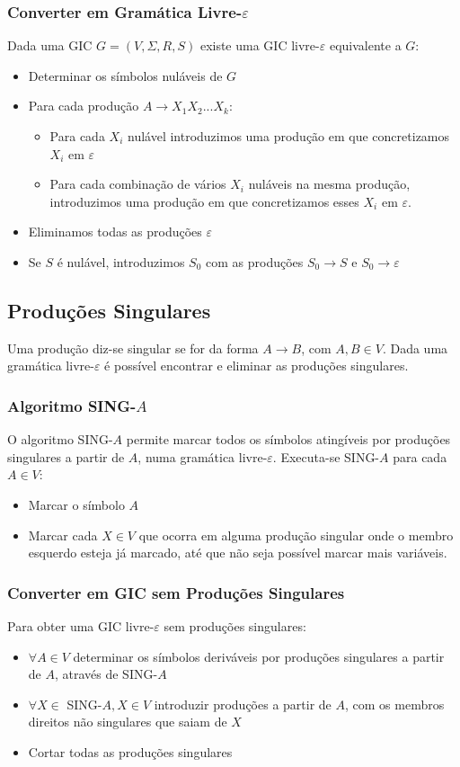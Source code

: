 \documentclass[10pt,a4paper]{report}
\begin{document}
\subsubsection{Converter em Gramática Livre-$\varepsilon$}
Dada uma GIC $G = (V, \Sigma, R, S)$ existe uma GIC livre-$\varepsilon$ equivalente a $G$:
\begin{itemize}
\item Determinar os símbolos nuláveis de $G$
\item Para cada produção $A \rightarrow X_1X_2...X_k$:
\begin{itemize}
\item Para cada $X_i$ nulável introduzimos uma produção em que concretizamos $X_i$ em $\varepsilon$
\item Para cada combinação de vários $X_i$ nuláveis na mesma produção, introduzimos uma produção em que concretizamos esses $X_i$ em $\varepsilon$.
\end{itemize}
\item Eliminamos todas as produções $\varepsilon$
\item Se $S$ é nulável, introduzimos $S_0$ com as produções $S_0 \rightarrow S$ e $S_0 \rightarrow \varepsilon$
\end{itemize}
\subsection{Produções Singulares}
Uma produção diz-se singular se for da forma $A \rightarrow B$, com $A, B \in V$. Dada uma gramática livre-$\varepsilon$ é possível encontrar e eliminar as produções singulares.
\subsubsection{Algoritmo SING-$A$}
O algoritmo SING-$A$ permite marcar todos os símbolos atingíveis por produções singulares a partir de $A$, numa gramática livre-$\varepsilon$. Executa-se SING-$A$ para cada $A \in V$:
\begin{itemize}
\item Marcar o símbolo $A$
\item Marcar cada $X \in V$ que ocorra em alguma produção singular onde o membro esquerdo esteja já marcado, até que não seja possível marcar mais variáveis.
\end{itemize}
\subsubsection{Converter em GIC sem Produções Singulares}
Para obter uma GIC livre-$\varepsilon$ sem produções singulares:
\begin{itemize}
\item $\forall A \in V$ determinar os símbolos deriváveis por produções singulares a partir de $A$, através de SING-$A$
\item $\forall X \in$ SING-$A, X \in V$ introduzir produções a partir de $A$, com os membros direitos não singulares que saiam de $X$
\item Cortar todas as produções singulares
\end{itemize}
\end{document}
